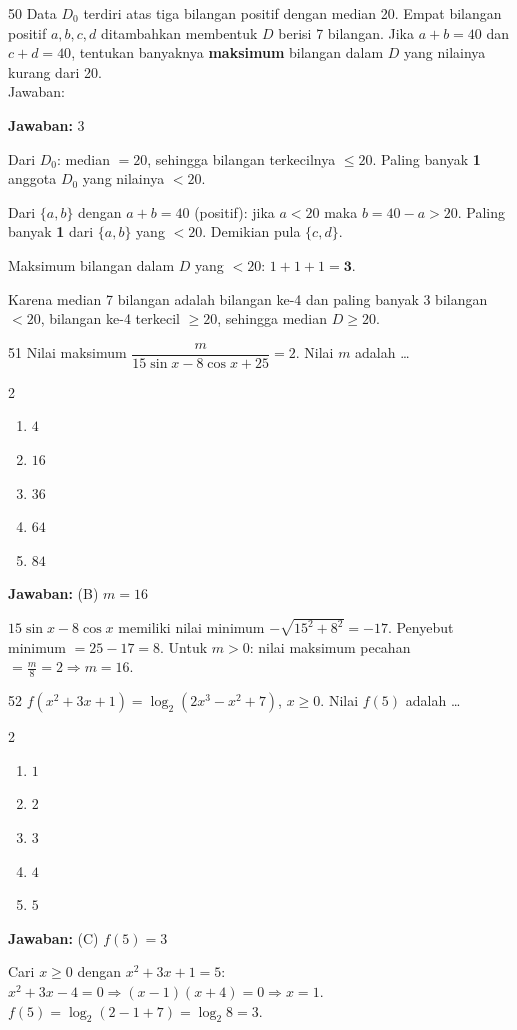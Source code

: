 \documentclass[11pt]{article}
\newcommand{\jawaban}[1]{%
  \noindent\colorbox{gold!30}{\parbox{\dimexpr\linewidth-2\fboxsep\relax}{%
    \textbf{Jawaban:} #1}}\par\smallskip}
\newenvironment{pilB}{%
  \par\smallskip\begin{multicols}{2}
  \begin{enumerate}[label=(\Alph*),leftmargin=*,itemsep=1pt,topsep=3pt]}%
  {\end{enumerate}\end{multicols}}
\begin{document}
\begin{soal}{50}
Data $D_0$ terdiri atas tiga bilangan positif dengan median 20.
Empat bilangan positif $a,b,c,d$ ditambahkan membentuk $D$ berisi 7
bilangan. Jika $a+b=40$ dan $c+d=40$, tentukan banyaknya
\textbf{maksimum} bilangan dalam $D$ yang nilainya kurang dari 20.\\[0.4em]
Jawaban:\enspace\underline{\hspace{4cm}}
\end{soal}
\begin{pembox}
\jawaban{$3$}
Dari $D_0$: median $=20$, sehingga bilangan terkecilnya $\leq20$.
Paling banyak \textbf{1} anggota $D_0$ yang nilainya $<20$.

Dari $\{a,b\}$ dengan $a+b=40$ (positif): jika $a<20$ maka $b=40-a>20$.
Paling banyak \textbf{1} dari $\{a,b\}$ yang $<20$. Demikian pula $\{c,d\}$.

Maksimum bilangan dalam $D$ yang $<20$: $1+1+1=\mathbf{3}$.

Karena median 7 bilangan adalah bilangan ke-4 dan paling banyak 3 bilangan $<20$,
bilangan ke-4 terkecil $\geq20$, sehingga median $D\geq20$.
\end{pembox}


\begin{soal}{51}
Nilai maksimum $\dfrac{m}{15\sin x-8\cos x+25}=2$. Nilai $m$ adalah \ldots
\begin{pilB}\item $4$\item $16$\item $36$\item $64$\item $84$\end{pilB}
\end{soal}
\begin{pembox}
\jawaban{(B) $m=16$}
$15\sin x-8\cos x$ memiliki nilai minimum $-\sqrt{15^2+8^2}=-17$.
Penyebut minimum $=25-17=8$.
Untuk $m>0$: nilai maksimum pecahan $=\tfrac{m}{8}=2\Rightarrow m=16$.
\end{pembox}

\begin{soal}{52}
$f(x^2+3x+1)=\log_2(2x^3-x^2+7)$, $x\geq0$. Nilai $f(5)$ adalah \ldots
\begin{pilB}\item $1$\item $2$\item $3$\item $4$\item $5$\end{pilB}
\end{soal}
\begin{pembox}
\jawaban{(C) $f(5)=3$}
Cari $x\geq0$ dengan $x^2+3x+1=5$: $x^2+3x-4=0\Rightarrow(x-1)(x+4)=0\Rightarrow x=1$.
$f(5)=\log_2(2-1+7)=\log_2 8=3$.
\end{pembox}
\end{document}
